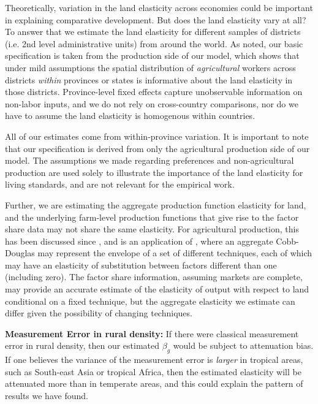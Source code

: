 Theoretically, variation in the land elasticity across economies could be important in explaining comparative development. But does the land elasticity vary at all? To answer that we estimate the land elasticity for different samples of districts (i.e. 2nd level administrative units) from around the world. As noted, our basic specification is taken from the production side of our model, which shows that under mild assumptions the spatial distribution of \textit{agricultural} workers across districts \textit{within} provinces or states is informative about the land elasticity in those districts. Province-level fixed effects capture unobservable information on non-labor inputs, and we do not rely on cross-country comparisons, nor do we have to assume the land elasticity is homogenous within countries. 

All of our estimates come from within-province variation. It is important to note that our specification is derived from only the agricultural production side of our model. The assumptions we made regarding preferences and non-agricultural production are used solely to illustrate the importance of the land elasticity for living standards, and are not relevant for the empirical work.



Further, we are estimating the aggregate production function elasticity for land, and the underlying farm-level production functions that give rise to the factor share data may not share the same elasticity. For agricultural production, this has been discussed since \citet{Hayami:1970ly}, and is an application of \citet{houthakker1955}, where an aggregate Cobb-Douglas may represent the envelope of a set of different techniques, each of which may have an elasticity of substitution between factors different than one (including zero). The factor share information, assuming markets are complete, may provide an accurate estimate of the elasticity of output with respect to land conditional on a fixed technique, but the aggregate elasticity we estimate can differ given the possibility of changing techniques. 


\vspace{.5cm}\noindent\textbf{Measurement Error in rural density:} If there were classical measurement error in rural density, then our estimated $\beta_g$ would be subject to attenuation bias. If one believes the variance of the measurement error is \textit{larger} in tropical areas, such as South-east Asia or tropical Africa, then the estimated elasticity will be attenuated more than in temperate areas, and this could explain the pattern of results we have found. 

